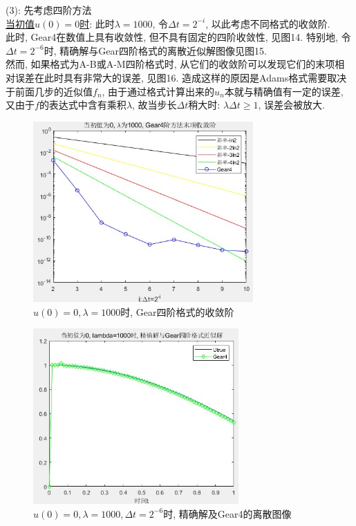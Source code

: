 \documentclass[12pt]{article}
\begin{document}
\noindent (3): 先考虑四阶方法\\
\underline{当初值$u(0)=0$时}: 此时$\lambda=1000$, 令$\Delta{t}=2^{-i}$, 以此考虑不同格式的收敛阶.\\
此时, Gear4在数值上具有收敛性, 但不具有固定的四阶收敛性, 见图14. 特别地, 令$\Delta{t}=2^{-6}$时, 精确解与Gear四阶格式的离散近似解图像见图15.\\
然而, 如果格式为A-B或A-M四阶格式时, 从它们的收敛阶可以发现它们的末项相对误差在此时具有非常大的误差, 见图16. 造成这样的原因是Adams格式需要取决于前面几步的近似值$f_n$, 由于通过格式计算出来的$u_n$本就与精确值有一定的误差, 又由于$f$的表达式中含有乘积$\lambda$, 故当步长$\Delta{t}$稍大时: $\lambda\Delta{t}\ge1$, 误差会被放大.
\begin{figure}[H]
	\centering
	\includegraphics[width=0.75\textwidth]{14}
	\caption{$u(0)=0, \lambda=1000$时, Gear四阶格式的收敛阶}
\end{figure}
\begin{figure}[H]
	\centering
	\includegraphics[width=0.7\textwidth]{15}
	\caption{$u(0)=0, \lambda=1000,\Delta{t}=2^{-6}$时, 精确解及Gear4的离散图像}
\end{figure}
\end{document}
